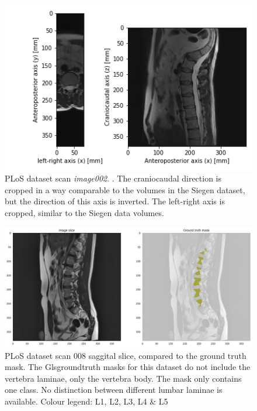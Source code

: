 \begin{figure}
    \centering
    \includegraphics[width=.95\textwidth]{automated_graphs/PLoS_img02.png}
    \caption{
        PLoS dataset scan \textit{image002}. \label{fig:PLoS_img02}. The craniocaudal direction is cropped in a way comparable to the volumes in the Siegen dataset, but the direction of this axis is inverted.
        The left-right axis is cropped, similar to the Siegen data volumes.
    }
\end{figure}
\begin{figure}
    \centering
    \includegraphics[width=.95\textwidth]{images/PLoS_s8_mask.pdf}
    \caption{
        PLoS dataset scan 008 saggital slice, compared to the ground truth mask.
        The Gls{groundtruth} masks for this dataset do not include the vertebra laminae, only the vertebra body.
        The mask only contains one class. No distinction between different lumbar laminae is available.
        \newline\noindent Colour legend: \newline
\noindent{}  L1, L2, L3, L4 \& L5
    }
\end{figure}